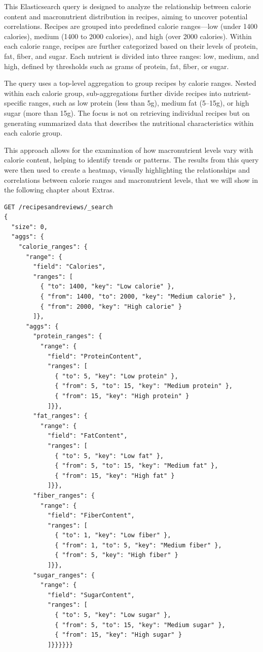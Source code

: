 \begin{enumerate}
    This Elasticsearch query is designed to analyze the relationship between calorie content and macronutrient distribution in recipes, aiming to uncover potential correlations. Recipes are grouped into predefined calorie ranges—low (under 1400 calories), medium (1400 to 2000 calories), and high (over 2000 calories). Within each calorie range, recipes are further categorized based on their levels of protein, fat, fiber, and sugar. Each nutrient is divided into three ranges: low, medium, and high, defined by thresholds such as grams of protein, fat, fiber, or sugar.

    The query uses a top-level aggregation to group recipes by calorie ranges. Nested within each calorie group, sub-aggregations further divide recipes into nutrient-specific ranges, such as low protein (less than 5g), medium fat (5–15g), or high sugar (more than 15g). The focus is not on retrieving individual recipes but on generating summarized data that describes the nutritional characteristics within each calorie group.

    This approach allows for the examination of how macronutrient levels vary with calorie content, helping to identify trends or patterns. The results from this query were then used to create a heatmap, visually highlighting the relationships and correlations between calorie ranges and macronutrient levels, that we will show in the following chapter about Extras.
    
    \begin{verbatim}
GET /recipesandreviews/_search
{
  "size": 0,
  "aggs": {
    "calorie_ranges": {
      "range": {
        "field": "Calories",
        "ranges": [
          { "to": 1400, "key": "Low calorie" },
          { "from": 1400, "to": 2000, "key": "Medium calorie" },
          { "from": 2000, "key": "High calorie" }
        ]},
      "aggs": {
        "protein_ranges": {
          "range": {
            "field": "ProteinContent",
            "ranges": [
              { "to": 5, "key": "Low protein" },
              { "from": 5, "to": 15, "key": "Medium protein" },
              { "from": 15, "key": "High protein" }
            ]}},
        "fat_ranges": {
          "range": {
            "field": "FatContent",
            "ranges": [
              { "to": 5, "key": "Low fat" },
              { "from": 5, "to": 15, "key": "Medium fat" },
              { "from": 15, "key": "High fat" }
            ]}},
        "fiber_ranges": {
          "range": {
            "field": "FiberContent",
            "ranges": [
              { "to": 1, "key": "Low fiber" },
              { "from": 1, "to": 5, "key": "Medium fiber" },
              { "from": 5, "key": "High fiber" }
            ]}},
        "sugar_ranges": {
          "range": {
            "field": "SugarContent",
            "ranges": [
              { "to": 5, "key": "Low sugar" },
              { "from": 5, "to": 15, "key": "Medium sugar" },
              { "from": 15, "key": "High sugar" }
            ]}}}}}}
    \end{verbatim}


\end{enumerate}
